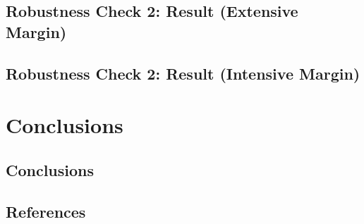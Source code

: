 \documentclass[ review  , 3p ]{elsarticle}
\begin{document}
  \hypertarget{robustness-check-2-result-extensive-margin}{%
  \subsection{Robustness Check 2: Result (Extensive Margin)}\label{robustness-check-2-result-extensive-margin}}
  
  \hypertarget{robustness-check-2-result-intensive-margin}{%
  \subsection{Robustness Check 2: Result (Intensive Margin)}\label{robustness-check-2-result-intensive-margin}}
  
  \hypertarget{conclusions}{%
  \section{Conclusions}\label{conclusions}}
  
  \hypertarget{conclusions-1}{%
  \subsection{Conclusions}\label{conclusions-1}}
  
  \clearpage
  
  \hypertarget{references}{%
  \subsection*{References}\label{references}}
\end{document}
